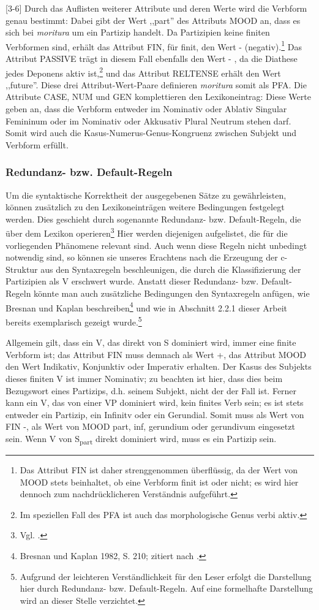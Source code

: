 \documentclass[12pt,a4paper]{article}
\begin{document}
[3-6] Durch das Auflisten weiterer Attribute und deren Werte wird die Verbform genau bestimmt: Dabei gibt der Wert ,,part'' des Attributs MOOD an, dass es sich bei \textit{moritura} um ein Partizip handelt. Da Partizipien keine finiten Verbformen sind, erhält das Attribut FIN, für finit, den Wert - (negativ).\footnote{Das Attribut FIN ist daher strenggenommen überflüssig, da der Wert von MOOD stets beinhaltet, ob eine Verbform finit ist oder nicht; es wird hier dennoch zum nachdrücklicheren Verständnis aufgeführt.} Das Attribut PASSIVE trägt in diesem Fall ebenfalls den Wert - , da die Diathese jedes Deponens aktiv ist,\footnote{Im speziellen Fall des PFA ist auch das morphologische Genus verbi aktiv.} und das Attribut RELTENSE erhält den Wert ,,future''. Diese drei Attribut-Wert-Paare definieren \textit{moritura} somit als PFA. Die Attribute CASE, NUM und GEN komplettieren den Lexikoneintrag: Diese Werte geben an, dass die Verbform entweder im Nominativ oder Ablativ Singular Femininum oder im Nominativ oder Akkusativ Plural Neutrum stehen darf. Somit wird auch die Kasus-Numerus-Genus-Kongruenz zwischen Subjekt und Verbform erfüllt.

\subsubsection{Redundanz- bzw. Default-Regeln}
Um die syntaktische Korrektheit der ausgegebenen Sätze zu gewährleisten, können zusätzlich zu den Lexikoneinträgen weitere Bedingungen festgelegt werden. Dies geschieht durch sogenannte Redundanz- bzw. Default-Regeln, die über dem Lexikon operieren\footnote{Vgl. \cite[23-4]{Rohrer}.} Hier werden diejenigen aufgelistet, die für die vorliegenden Phänomene relevant sind. Auch wenn diese Regeln nicht unbedingt notwendig sind, so können sie unseres Erachtens nach die Erzeugung der c-Struktur aus den Syntaxregeln beschleunigen, die durch die Klassifizierung der Partizipien als V erschwert wurde. Anstatt dieser Redundanz- bzw. Default-Regeln könnte man auch zusätzliche Bedingungen den Syntaxregeln anfügen, wie Bresnan und Kaplan beschreiben\footnote{Bresnan und Kaplan 1982, S. 210; zitiert nach \cite[54]{Rohrer}.} und wie in Abschnitt 2.2.1 dieser Arbeit bereits exemplarisch gezeigt wurde.\footnote{Aufgrund der leichteren Verständlichkeit für den Leser erfolgt die Darstellung hier durch Redundanz- bzw. Default-Regeln. Auf eine formelhafte Darstellung wird an dieser Stelle verzichtet.}

Allgemein gilt, dass ein V, das direkt von S dominiert wird, immer eine
finite Verbform ist; das Attribut FIN muss demnach als Wert +, das Attribut MOOD den Wert Indikativ, Konjunktiv oder Imperativ erhalten.
Der Kasus des Subjekts dieses finiten V ist immer Nominativ; zu beachten ist hier, dass dies beim Bezugswort eines Partizips, d.h. seinem Subjekt, nicht der der Fall ist.
Ferner kann ein V, das von einer VP dominiert wird, kein finites Verb sein; es ist stets entweder ein Partizip, ein Infinitv oder ein Gerundial. Somit muss als Wert von FIN -, als Wert von MOOD part, inf, gerundium  oder gerundivum eingesetzt sein.
Wenn V von S\textsubscript{part} direkt dominiert wird, muss es ein Partizip sein.
\end{document}
